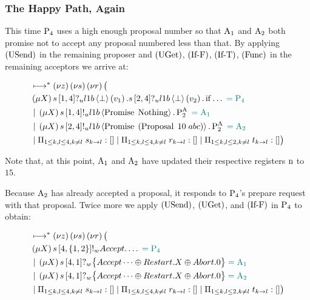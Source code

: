 \subsubsection{The Happy Path, Again}

This time $\Proposer{4}$ uses a high enough proposal number so that $\Acceptor{1}$ and $\Acceptor{2}$ both promise not to accept any proposal numbered less than that.
By applying $\RUsend$ in the remaining proposer and $\RUget$, $\RIfF$, $\RIfT$, $\RSideEffect$ in the remaining acceptors we arrive at:

\begin{align*}
&\mapstostar \NuChannels \big (\\
&\Mu{\RecursionVariable} \ReceiveUnreliableP{s}{1}{4}{\LOneB}{\bot}{v_1}.\ReceiveUnreliableP{s}{2}{4}{\LOneB}{\bot}{v_2}.\If{\dots} \comment{= \Proposer{4}}\\
&\Or \Mu{\RecursionVariable} \SendUnreliableP{s}{1}{4}{\LOneB}{\Promise{\Nothing}}.\PaTwo \comment{= \Acceptor{1}}\\
&\Or \Mu{\RecursionVariable} \SendUnreliableP{s}{2}{4}{\LOneB}{\Promise{\Paren{\ProposalC{10}{abc}}}}.\PaTwo \comment{= \Acceptor{2}}\\
&\Or \InnerSessionQueues{s}
\Or \InnerSessionQueues{r}
\Or \OuterSessionQueues
\big )
\end{align*}

Note that, at this point, $\Acceptor{1}$ and $\Acceptor{2}$ have updated their respective registers $\NumberRegister$ to $15$.

Because $\Acceptor{2}$ has already accepted a proposal, it responds to $\Proposer{4}$'s prepare request with that proposal.
Twice more we apply $\RUsend$, $\RUget$, and $\RIfF$ in $\Proposer{4}$ to obtain:

\begin{align*}
&\mapstostar \NuChannels \big (\\
&\Mu{\RecursionVariable} \SendWeaklyP{s}{4}{\Curly{1,2}}{\Accept}{\dots} \comment{= \Proposer{4}}\\
&\Or \Mu{\RecursionVariable} \ReceiveWeaklyP{s}{4}{1}{\BeginPaCont} \comment{= \Acceptor{1}}\\
&\Or \Mu{\RecursionVariable} \ReceiveWeaklyP{s}{4}{1}{\BeginPaCont} \comment{= \Acceptor{2}}\\
&\Or \InnerSessionQueues{s}
\Or \InnerSessionQueues{r}
\Or \OuterSessionQueues
\big )
\end{align*}

